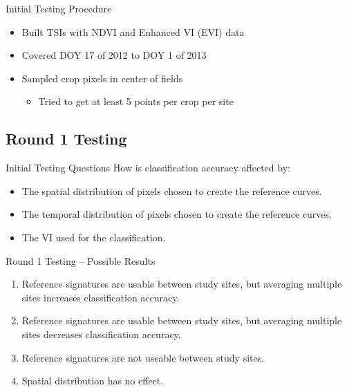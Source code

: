 \documentclass[  compress,xcolor={usenames,dvipsnames}]{beamer}
\begin{document}
\begin{frame}{Initial Testing Procedure}
\begin{itemize}
  \item Built TSIs with NDVI and Enhanced VI (EVI) data
  \item Covered DOY 17 of 2012 to DOY 1 of 2013
  \item Sampled crop pixels in center of fields
  \begin{itemize}
    \item Tried to get at least 5 points per crop per site
  \end{itemize}
\end{itemize}
\end{frame}


\subsection{Round 1 Testing}
\begin{frame}{Initial Testing Questions}
How is classification accuracy affected by:
\begin{itemize}
  \item The spatial distribution of pixels chosen to create the reference curves.
  \item The temporal distribution of pixels chosen to create the reference curves.
  \item The VI used for the classification.
\end{itemize}
\end{frame}

\begin{frame}{Round 1 Testing -- Possible Results}
\begin{enumerate}
  \item Reference signatures are usable between study sites, but averaging multiple sites increases classification accuracy.
  \item Reference signatures are usable between study sites, but averaging multiple sites decreases classification accuracy.
  \item Reference signatures are not useable between study sites.
  \item Spatial distribution has no effect.
\end{enumerate}
\end{frame}
\end{document}
